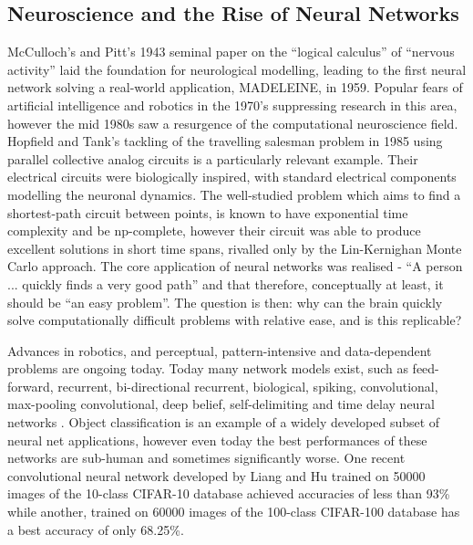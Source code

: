 \documentclass[11pt, twocolumn]{article}
\begin{document}
\subsection*{Neuroscience and the Rise of Neural Networks}
McCulloch's and Pitt's 1943 seminal paper on the ``logical calculus'' of ``nervous activity'' \cite{mcculloch1943logical} laid the foundation for neurological modelling, leading to the first  neural network solving a real-world application, \acs{MADELEINE}, in 1959. Popular fears of artificial intelligence and robotics in the 1970's suppressing research in this area, however the mid 1980s saw a resurgence of the computational neuroscience field. Hopfield and Tank's tackling of the travelling salesman problem in 1985 \cite{hopfield1985neural} using parallel collective analog circuits is a particularly relevant example. Their electrical circuits were biologically inspired, with standard electrical components modelling the neuronal dynamics. The well-studied problem which aims to find a shortest-path circuit between points, is known to have exponential time complexity and be np-complete, however their circuit was able to produce excellent solutions in short time spans, rivalled only by the Lin-Kernighan Monte Carlo approach. The core application of neural networks was realised - ``A person ... quickly finds a very good path'' \cite{hopfield1985neural} and that therefore, conceptually at least, it should be ``an easy problem''. The question is then: why can the brain quickly solve computationally difficult problems with relative ease, and is this replicable? 

Advances in robotics, and perceptual, pattern-intensive and data-dependent problems \cite{hopfield1985neural} are ongoing today. Today many network models exist, such as feed-forward, recurrent, bi-directional recurrent, biological, spiking, convolutional, max-pooling convolutional, deep belief, self-delimiting and time delay neural networks \cite{schmidhuber2015deep}. Object classification is an example of a widely developed subset of neural net applications, however even today the best performances of these networks are sub-human and sometimes significantly worse. One recent convolutional neural network developed by Liang and Hu \cite{liang2015recurrent} trained on 50000 images of the 10-class \acs{CIFAR}-10 database achieved accuracies of less than 93\% while another, trained on 60000 images of the 100-class \acs{CIFAR}-100 database has a best accuracy of only 68.25\%. 
\end{document}
